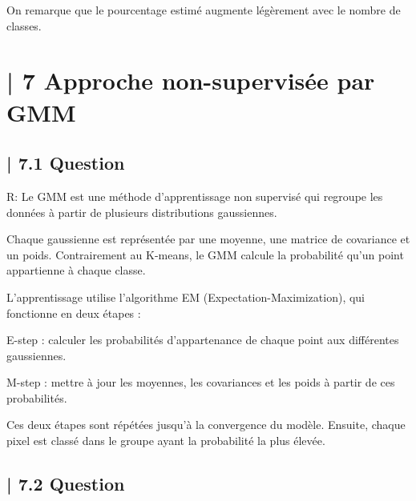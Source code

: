 On remarque que le pourcentage estimé augmente légèrement avec le nombre de classes. 

\section{| 7 Approche non-supervisée par GMM}


\subsection{| 7.1 Question}

R: Le GMM est une méthode d'apprentissage non supervisé qui regroupe les données à partir de plusieurs distributions gaussiennes.

Chaque gaussienne est représentée par une moyenne, une matrice de covariance et un poids. Contrairement au K-means, le GMM calcule la probabilité qu'un point appartienne à chaque classe.

L'apprentissage utilise l'algorithme EM (Expectation-Maximization), qui fonctionne en deux étapes :

E-step : calculer les probabilités d'appartenance de chaque point aux différentes gaussiennes.

M-step : mettre à jour les moyennes, les covariances et les poids à partir de ces probabilités.

Ces deux étapes sont répétées jusqu'à la convergence du modèle. Ensuite, chaque pixel est classé dans le groupe ayant la probabilité la plus élevée.

\subsection{| 7.2 Question}

